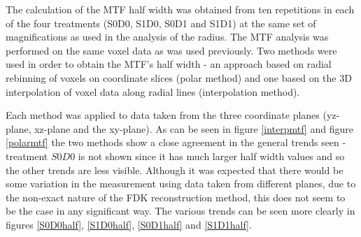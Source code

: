 \documentclass[
  twoside,
  11pt, a4paper,
  footinclude=true,
  headinclude=true,
  cleardoublepage=empty
]{scrbook}
\begin{document}
The calculation of the MTF half width was obtained from ten repetitions in each of the four treatments (S0D0, S1D0, S0D1 and S1D1) at the same set of magnifications as used in the analysis of the radius. The MTF analysis was performed on the same voxel data as was used previously. Two methods were used in order to obtain the MTF's half width - an approach based on radial rebinning of voxels on coordinate slices (polar method) and one based on the 3D interpolation of voxel data along radial lines (interpolation method).

Each method was applied to data taken from the three coordinate planes (yz-plane, xz-plane and the xy-plane). As can be seen in figure \ref{interpmtf} and figure \ref{polarmtf} the two methods show a close agreement in the general trends seen - treatment $S0D0$ is not shown since it has much larger half width values and so the other trends are less visible. Although it was expected that there would be some variation in the measurement using data taken from different planes, due to the non-exact nature of the FDK reconstruction method, this does not seem to be the case in any significant way. The various trends can be seen more clearly in figures \ref{S0D0half}, \ref{S1D0half}, \ref{S0D1half} and \ref{S1D1half}.
\end{document}
